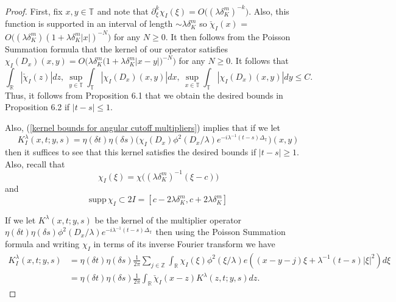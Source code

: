 \documentclass[11pt]{amsart}
\numberwithin{equation}{section}
\newcommand{\la}{\lambda}
\newcommand{\supp}[1]{\text{supp}\, #1}
\newcommand{\Z}[1][]{\mathbb{Z}^#1}
\newcommand{\T}[1][]{\mathbb{T}^#1}
\newcommand{\laplac}[1]{\Delta_{#1}}
\newcommand{\dK}[1]{\delta_{K}^{#1}}
\begin{document}
\begin{proof}
First, fix $x,y \in \T{}$ and note that $\partial_{\xi}^{k}\chi_{I}(\xi) = O\big( (\la \dK{m})^{-k}\big)$. Also, this function is supported in an interval of length $\sim \la \dK{m}$ so  $\check{\chi}_{I}(x)$ =  $O\big( (\la \dK{m})(1+\la \dK{m}|x|)^{-N}\big)$ for any $N \geq 0$. It then follows from the Poisson Summation formula that the kernel of our operator satisfies
$\chi_I(D_x)(x,y) = O\Big(\la \dK{m}\big(1 + \la \dK{m}|x- y|\big)^{-N}\Big)$ for any $N \geq 0$. It follows that
\begin{equation} \label{kernel bounds for angular cutoff multipliers}
    \int_{\mathbb{R}}|\check{\chi}_{I}(z)|dz, \ \sup_{y \in \mathbb{T}}\int_{\mathbb{T}} |\chi_{I}(D_x)(x,y)|dx , \ \sup_{x \in \mathbb{T}}\int_{\mathbb{T}} |\chi_{I}(D_x)(x,y)|dy \leq C.
\end{equation}
Thus, it follows from Proposition 6.1 that we obtain the desired bounds in Proposition 6.2 if $|t-s| \leq 1$.
\par
Also, (\ref{kernel bounds for angular cutoff multipliers}) implies that if we let 
\begin{equation}
    K^{\la}_{I}(x,t;y,s) = \eta(\delta t)\eta(\delta s)\big(\chi_{I}(D_x)\phi^{2}(D_x / \la)e^{-i\la^{-1}(t-s)\laplac{\T{}}}\big)(x,y)
\end{equation}
then it suffices to see that this kernel satisfies the desired bounds if $|t-s| \geq 1$. Also, recall that
\begin{equation} 
    \chi_I(\xi) = \chi\big((\la \dK{m})^{-1}(\xi - c)\big)
\end{equation}
and
\begin{equation} \label{support property of chi_I}
    \supp{\chi_I} \subset 2I = [c -2\la\dK{m}, c+2\la \dK{m} ]
\end{equation}
\par
If we let $K^{\la}(x,t;y,s)$ be the kernel of the multiplier operator $\eta(\delta t)\eta(\delta s)\phi^2(D_x/\la)e^{-i\la^{-1}(t-s)\laplac{\T{}}}$ then using the Poisson Summation formula and writing $\chi_{I}$ in terms of its inverse Fourier transform we have
\begin{equation} \label{K^(la, theta) Poisson summation 1}
\begin{split}
    K^{\la}_{I} (x,t;y,s) &= \eta(\delta t) \eta(\delta s)\frac{1}{2 \pi} \sum_{j \in \Z{}}\int_{\mathbb{R}} \chi_{I}(\xi)\phi^2(\xi/\la)e((x-y-j)\xi + \la^{-1}(t-s)|\xi|^2)d\xi\\
    &= \eta(\delta t) \eta(\delta s) \frac{1}{2\pi}\int_{\mathbb{R}} \check{\chi}_{I} (x - z)K^{\la}(z,t; y, s) dz.

\end{split}
\end{equation}
\end{proof}
\end{document}
